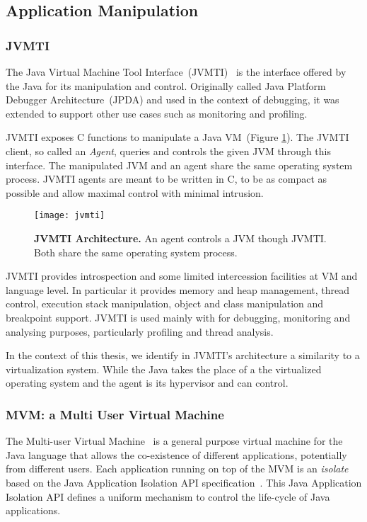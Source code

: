 \subsection{Application Manipulation}\label{sec:virtualization_control}

\subsubsection*{JVMTI}
The Java Virtual Machine Tool Interface~(JVMTI)~\cite{JVMPI} is the interface offered by the Java \VM for its manipulation and control. Originally called Java Platform Debugger Architecture~(JPDA) and used in the context of debugging, it was extended to support other use cases such as monitoring and profiling.

JVMTI exposes C functions to manipulate a Java VM~(Figure \ref{fig:jvmti}). The JVMTI client, so called an \emph{Agent}, queries and controls the given JVM through this interface. The manipulated JVM and an agent share the same operating system process. JVMTI agents are meant to be written in C, to be as compact as possible and allow maximal control with minimal intrusion.

\begin{figure}[ht]
\begin{center}
\texttt{[image: jvmti]}
\caption{\textbf{JVMTI Architecture.} An agent controls a JVM though JVMTI. Both share the same operating system process.\label{fig:jvmti}}
\end{center}
\end{figure}

JVMTI provides introspection and some limited intercession facilities at VM and language level. In particular it provides memory and heap management, thread control, execution stack manipulation, object and class manipulation and breakpoint support. JVMTI is used mainly with for debugging, monitoring and analysing purposes, particularly profiling and thread analysis.

In the context of this thesis, we identify in JVMTI's architecture a similarity to a virtualization system. While the Java \VM takes the place of a the virtualized operating system and the agent is its hypervisor and can control.

\subsubsection*{MVM: a Multi User Virtual Machine}
The Multi-user Virtual Machine~\cite{Czaj03a,Czaj01a} is a general purpose virtual machine for the Java language that allows the co-existence of different applications, potentially from different users. Each application running on top of the MVM is an \emph{isolate} based on the Java Application Isolation API specification~\cite{JSR121}. This Java Application Isolation API defines a uniform mechanism to control the life-cycle of Java applications.

